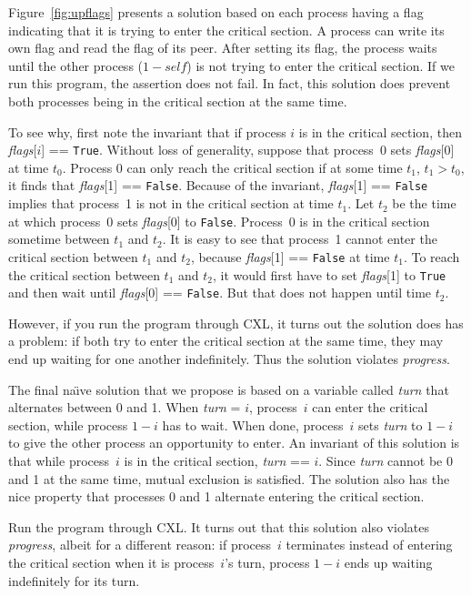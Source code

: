 \documentclass{report}
\begin{document}
Figure~\ref{fig:upflags} presents a solution based on each process having
a flag indicating that it is trying to enter the critical section.
A process can write its own flag and read the flag of its peer.
After setting its flag, the process waits until the other process
($1 - \mathit{self}$) is not trying to enter the critical section.
If we run this program, the assertion does not fail.  In fact, this
solution does prevent both processes being in the critical section at
the same time.

To see why, first note the invariant that if process $i$ is in the
critical section, then \textit{flags}[$i$] == \texttt{True}.
Without loss of generality,
suppose that process~0 sets \textit{flags}[0] at time $t_0$.
Process 0 can only reach the critical section if at some time $t_1$,
$t_1 > t_0$, it finds that \textit{flags}[1] == \texttt{False}.
Because of the invariant, \textit{flags}[1] == \texttt{False} implies that
process~1 is not in the critical section at time $t_1$.
Let $t_2$ be the time at which process~0 sets \textit{flags}[0]
to \texttt{False}.  Process~0 is in the critical section sometime
between $t_1$ and $t_2$.
It is easy to see that process~1 cannot enter the critical section
between $t_1$ and $t_2$, because \textit{flags}[1] == \texttt{False} at
time $t_1$.  To reach the critical section between $t_1$ and $t_2$,
it would first have to set \textit{flags}[1] to \texttt{True} and
then wait until \textit{flags}[0] == \texttt{False}.  But that does not happen
until time $t_2$.

However, if you run the program through CXL, it turns out the solution
does has a problem: if both try to enter the critical section at the same
time, they may end up waiting for one another indefinitely.  Thus the
solution violates \emph{progress}.

The final na\"{\i}ve solution that we propose
is based on a variable called \textit{turn}
that alternates between 0 and 1.  When \textit{turn} = $i$, process~$i$ can
enter the critical section, while process $1-i$ has to wait.  When done,
process~$i$ sets \textit{turn} to $1-i$ to give the other process an
opportunity to enter.
An invariant of this solution is that while process~$i$ is in the critical
section, \textit{turn} == $i$.
Since \textit{turn} cannot be 0 and 1 at
the same time, mutual exclusion is satisfied.
The solution also has the nice property that
processes 0 and 1 alternate entering the critical section.

Run the program through CXL.  It turns out that this solution also violates
\emph{progress}, albeit for a different reason:
if process~$i$ terminates instead of entering the critical section when it
is process~$i$'s turn, process $1-i$ ends up waiting indefinitely for its
turn.
\end{document}
